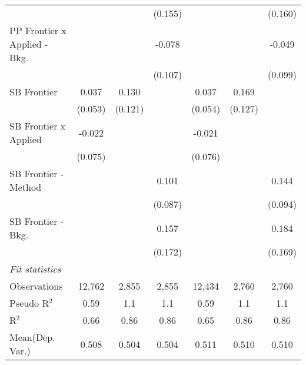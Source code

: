 \begin{tabular}{lcccccc}
                                  &                &         & (0.155)       &                &         & (0.160)\\   
   PP Frontier x Applied - Bkg.   &                &         & -0.078        &                &         & -0.049\\   
                                  &                &         & (0.107)       &                &         & (0.099)\\   
   SB Frontier                    & 0.037          & 0.130   &               & 0.037          & 0.169   &   \\   
                                  & (0.053)        & (0.121) &               & (0.054)        & (0.127) &   \\   
   SB Frontier x Applied          & -0.022         &         &               & -0.021         &         &   \\   
                                  & (0.075)        &         &               & (0.076)        &         &   \\   
   SB Frontier - Method           &                &         & 0.101         &                &         & 0.144\\   
                                  &                &         & (0.087)       &                &         & (0.094)\\   
   SB Frontier - Bkg.             &                &         & 0.157         &                &         & 0.184\\   
                                  &                &         & (0.172)       &                &         & (0.169)\\   
   \midrule
   \emph{Fit statistics}\\
   Observations                   & 12,762         & 2,855   & 2,855         & 12,434         & 2,760   & 2,760\\  
   Pseudo R$^2$                   & 0.59           & 1.1     & 1.1           & 0.59           & 1.1     & 1.1\\  
   R$^2$                          & 0.66           & 0.86    & 0.86          & 0.65           & 0.86    & 0.86\\  
Mean(Dep. Var.) & 0.508 & 0.504 & 0.504 & 0.511 & 0.510 & 0.510 \\
   

\end{tabular}
